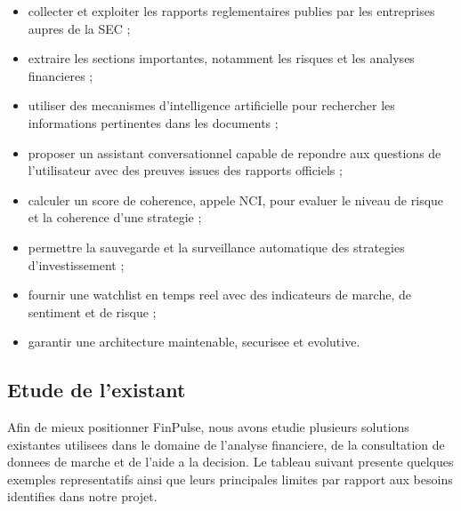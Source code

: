 \begin{itemize}
    \item collecter et exploiter les rapports reglementaires publies par les entreprises
    aupres de la SEC ;
    \item extraire les sections importantes, notamment les risques et les analyses
    financieres ;
    \item utiliser des mecanismes d'intelligence artificielle pour rechercher les
    informations pertinentes dans les documents ;
    \item proposer un assistant conversationnel capable de repondre aux questions de
    l'utilisateur avec des preuves issues des rapports officiels ;
    \item calculer un score de coherence, appele NCI, pour evaluer le niveau de risque
    et la coherence d'une strategie ;
    \item permettre la sauvegarde et la surveillance automatique des strategies
    d'investissement ;
    \item fournir une watchlist en temps reel avec des indicateurs de marche, de
    sentiment et de risque ;
    \item garantir une architecture maintenable, securisee et evolutive.
\end{itemize}

\subsection{Etude de l'existant}

Afin de mieux positionner FinPulse, nous avons etudie plusieurs solutions existantes
utilisees dans le domaine de l'analyse financiere, de la consultation de donnees de
marche et de l'aide a la decision. Le tableau suivant presente quelques exemples
representatifs ainsi que leurs principales limites par rapport aux besoins identifies
dans notre projet.

